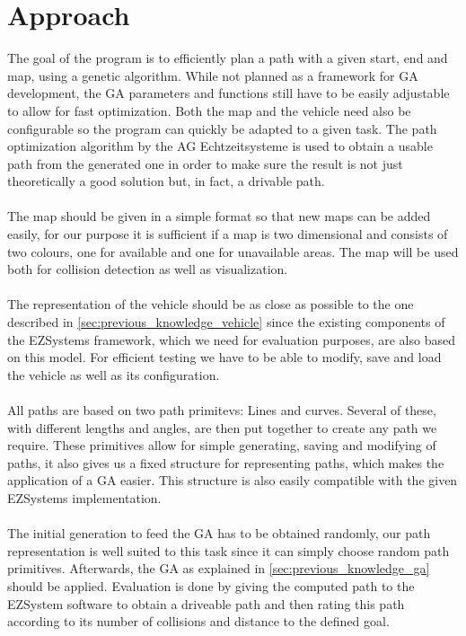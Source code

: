 \chapter{Approach}
\label{cha:program_idea}

The goal of the program is to efficiently plan a path with a given start, end and map, using a genetic algorithm. While not planned as a framework for GA development, the GA parameters and functions still have to be easily adjustable to allow for fast optimization. Both the map and the vehicle need also be configurable so the program can quickly be adapted to a given task. The path optimization algorithm by the AG Echtzeitsysteme is used to obtain a usable path from the generated one in order to make sure the result is not just theoretically a good solution but, in fact, a drivable path.\\
\\
The map should be given in a simple format so that new maps can be added easily, for our purpose it is sufficient if a map is two dimensional and consists of two colours, one for available and one for unavailable areas. The map will be used both for collision detection as well as visualization.\\
\\
The representation of the vehicle should be as close as possible to the one described in \ref{sec:previous_knowledge_vehicle} since the existing components of the EZSystems framework, which we need for evaluation purposes, are also based on this model. For efficient testing we have to be able to modify, save and load the vehicle as well as its configuration.\\
\\
All paths are based on two path primitevs: Lines and curves. Several of these, with different lengths and angles, are then put together to create any path we require. These primitives allow for simple generating, saving and modifying of paths, it also gives us a fixed structure for representing paths, which makes the application of a GA easier. This structure is also easily compatible with the given EZSystems implementation.\\
\\
The initial generation to feed the GA has to be obtained randomly, our path representation is well suited to this task since it can simply choose random path primitives. Afterwards, the GA as explained in \ref{sec:previous_knowledge_ga} should be applied. Evaluation is done by giving the computed path to the EZSystem software to obtain a driveable path and then rating this path according to its number of collisions and distance to the defined goal.


